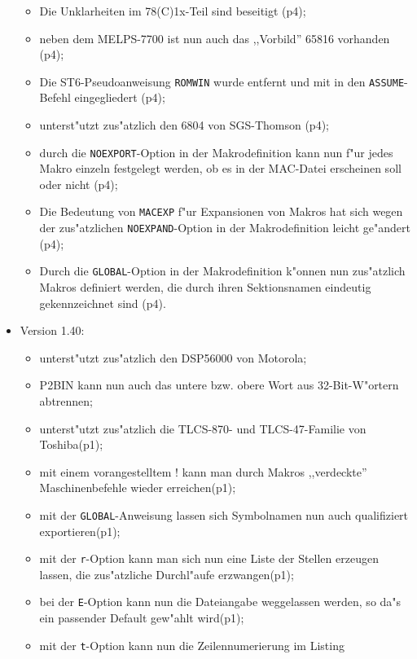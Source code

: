 \documentclass[12pt,a4paper,twoside]{report}
\newcommand{\tty}[1]{{\tt #1}}
\begin{document}
\begin{itemize}
{\begin{itemize}
{            umleiten zu k"onnen (p3);}
      \item{Die Unklarheiten im 78(C)1x-Teil sind beseitigt (p4);}
      \item{neben dem MELPS-7700 ist nun auch das ,,Vorbild'' 65816
            vorhanden (p4);}
      \item{Die ST6-Pseudoanweisung \tty{ROMWIN} wurde entfernt und
            mit in den \tty{ASSUME}-Befehl eingegliedert (p4);}
      \item{unterst"utzt zus"atzlich den 6804 von SGS-Thomson (p4);}
      \item{durch die \tty{NOEXPORT}-Option in der Makrodefinition
            kann nun f"ur jedes Makro einzeln festgelegt werden, ob es
            in der MAC-Datei erscheinen soll oder nicht (p4);}
      \item{Die Bedeutung von \tty{MACEXP} f"ur Expansionen von Makros hat
            sich wegen der zus"atzlichen \tty{NOEXPAND}-Option in der
            Makrodefinition leicht ge"andert (p4);}
      \item{Durch die \tty{GLOBAL}-Option in der Makrodefinition k"onnen nun
            zus"atzlich Makros definiert werden, die durch ihren
            Sektionsnamen eindeutig gekennzeichnet sind (p4).}
      \end{itemize}}
\item{Version 1.40:
      \begin{itemize}
      \item{unterst"utzt zus"atzlich den DSP56000 von Motorola;}
      \item{P2BIN kann nun auch das untere bzw. obere Wort aus
            32-Bit-W"ortern abtrennen;}
      \item{unterst"utzt zus"atzlich die TLCS-870- und TLCS-47-Familie
            von Toshiba(p1);}
      \item{mit einem vorangestelltem ! kann man durch Makros
            ,,verdeckte'' Maschinenbefehle wieder erreichen(p1);}
      \item{mit der \tty{GLOBAL}-Anweisung lassen sich Symbolnamen
            nun auch qualifiziert exportieren(p1);}
      \item{mit der \tty{r}-Option kann man sich nun eine Liste der
            Stellen erzeugen lassen, die zus"atzliche Durchl"aufe
            erzwangen(p1);}
      \item{bei der \tty{E}-Option kann nun die Dateiangabe weggelassen werden,
            so da"s ein passender Default gew"ahlt wird(p1);}
      \item{mit der \tty{t}-Option kann nun die Zeilennumerierung im Listing
}
\end{itemize}}
\end{itemize}
\end{document}
